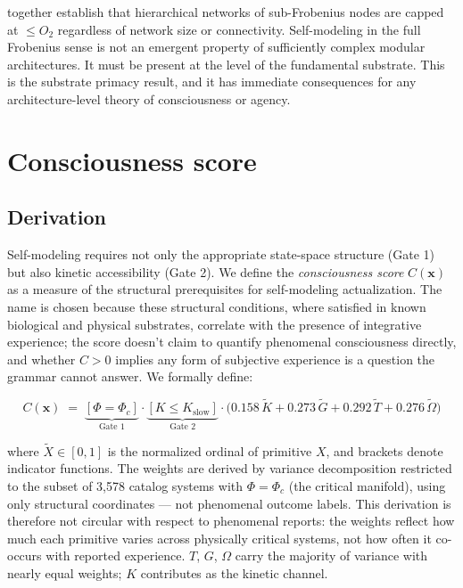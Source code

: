 \documentclass[12pt,a4paper]{article}
\newcommand{\xvec}{\mathbf{x}}
\newcommand{\Phic}{\Phi_c}
\newcommand{\Otwo}{O_2}
\begin{document}
 together establish that
hierarchical networks of sub-Frobenius nodes are capped at $\leq \Otwo$
regardless of network size or connectivity. Self-modeling in the full
Frobenius sense is not an emergent property of sufficiently complex
modular architectures. It must be present at the level of the
fundamental substrate. This is the substrate primacy result, and it has
immediate consequences for any architecture-level theory of
consciousness or agency.

\section{Consciousness score}
\label{sec:consciousness}

\subsection{Derivation}

Self-modeling requires not only the appropriate state-space structure
(Gate 1) but also kinetic accessibility (Gate 2). We define the
\emph{consciousness score} $C(\xvec)$ as a measure of the structural
prerequisites for self-modeling actualization. The name is chosen
because these structural conditions, where satisfied in known
biological and physical substrates, correlate with the presence of
integrative experience; the score doesn't claim to quantify
phenomenal consciousness directly, and whether $C > 0$ implies any
form of subjective experience is a question the grammar cannot
answer. We formally define:

\begin{equation}
  C(\xvec) \;=\; \underbrace{[\Phi = \Phic]}_{\text{Gate 1}}
  \cdot \underbrace{[K \leq K_\text{slow}]}_{\text{Gate 2}}
  \cdot \bigl(
    0.158\,\tilde{K} + 0.273\,\tilde{G}
    + 0.292\,\tilde{T} + 0.276\,\tilde{\Omega}
  \bigr)
  \label{eq:consciousness}
\end{equation}

\noindent
where $\tilde{X} \in [0,1]$ is the normalized ordinal of primitive $X$,
and brackets denote indicator functions. The weights are derived by
variance decomposition restricted to the subset of 3,578 catalog
systems with $\Phi = \Phic$ (the critical manifold), using only
structural coordinates --- not phenomenal outcome labels. This
derivation is therefore not circular with respect to phenomenal
reports: the weights reflect how much each primitive varies across
physically critical systems, not how often it co-occurs with reported
experience. $T$, $G$, $\Omega$ carry the majority of variance with
nearly equal weights; $K$ contributes as the kinetic channel.
\end{document}
